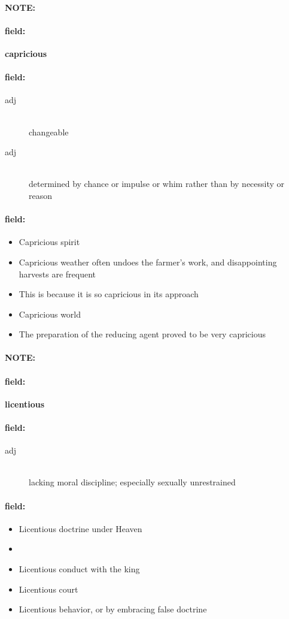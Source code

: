 \documentclass[12pt]{article}
\newenvironment{note}{\paragraph{NOTE:}}{}
\newenvironment{field}{\paragraph{field:}}{}
\begin{document}
\begin{note}
\begin{field}
\textbf{\large capricious}
\end{field}


\begin{field}
\begin{description}
\item[adj] \hfill \\ 
changeable

\item[adj] \hfill \\ 
determined by chance or impulse or whim rather than by necessity or reason

\end{description}
\end{field}

\begin{field}
\begin{itemize}
\item Capricious spirit
\item Capricious weather often undoes the farmer's work, and disappointing harvests are frequent
\item This is because it is so capricious in its approach
\item Capricious world
\item The preparation of the reducing agent proved to be very capricious
\end{itemize}
\end{field}
\end{note}
\begin{note}
\begin{field}
\textbf{\large licentious}
\end{field}


\begin{field}
\begin{description}
\item[adj] \hfill \\ 
lacking moral discipline; especially sexually unrestrained

\end{description}
\end{field}

\begin{field}
\begin{itemize}
\item Licentious doctrine under Heaven
\item 
\item Licentious conduct with the king
\item Licentious court
\item Licentious behavior, or by embracing false doctrine
\end{itemize}
\end{field}
\end{note}
\end{document}
